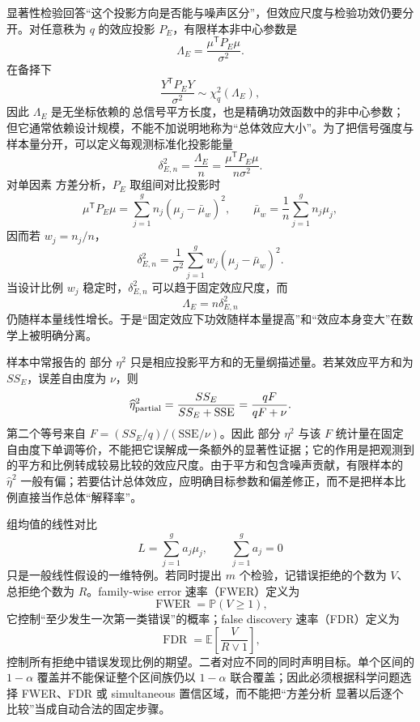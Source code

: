 \begin{definition}
显著性检验回答“这个投影方向是否能与噪声区分”，但效应尺度与检验功效仍要分开。对任意秩为 $q$ 的效应投影 $P_E$，有限样本非中心参数是
\begin{equation*}\Lambda_E
 =\frac{\mu^{\mathsf T}P_E\mu}{\sigma^2}.
\end{equation*}
在备择下
\[
 \frac{Y^{\mathsf T}P_EY}{\sigma^2}
 \sim\chi^2_q(\Lambda_E),
\]
因此 $\Lambda_E$ 是无坐标依赖的\,总信号平方长度，也是精确功效函数中的非中心参数；但它通常依赖设计规模，不能不加说明地称为“总体效应大小”。为了把信号强度与样本量分开，可以定义每观测标准化投影能量
\begin{equation*}\delta_{E,n}^2
 =\frac{\Lambda_E}{n}
 =\frac{\mu^{\mathsf T}P_E\mu}{n\sigma^2}.
\end{equation*}
对单因素 方差分析，$P_E$ 取组间对比投影时
\[
 \mu^{\mathsf T}P_E\mu
 =\sum_{j=1}^g n_j(\mu_j-\bar\mu_w)^2,
 \qquad
 \bar\mu_w=\frac1n\sum_{j=1}^gn_j\mu_j,
\]
因而若 $w_j=n_j/n$，
\[
 \delta_{E,n}^2
 =\frac1{\sigma^2}
 \sum_{j=1}^g w_j(\mu_j-\bar\mu_w)^2.
\]
当设计比例 $w_j$ 稳定时，$\delta_{E,n}^2$ 可以趋于固定效应尺度，而
\[
 \Lambda_E=n\delta_{E,n}^2
\]
仍随样本量线性增长。于是“固定效应下功效随样本量提高”和“效应本身变大”在数学上被明确分离。

样本中常报告的 部分 $\eta^2$ 只是相应投影平方和的无量纲描述量。若某效应平方和为 $SS_E$，误差自由度为 $\nu$，则
\begin{equation*}\widehat\eta^2_{\rm partial}
 =\frac{SS_E}{SS_E+\mathrm{SSE}}
 =\frac{qF}{qF+\nu}.
\end{equation*}
第二个等号来自 $F=(SS_E/q)/(\mathrm{SSE}/\nu)$。因此 部分 $\eta^2$ 与该 $F$ 统计量在固定自由度下单调等价，不能把它误解成一条额外的显著性证据；它的作用是把观测到的平方和比例转成较易比较的效应尺度。由于平方和包含噪声贡献，有限样本的 $\widehat\eta^2$ 一般有偏；若要估计总体效应，应明确目标参数和偏差修正，而不是把样本比例直接当作总体“解释率”。
\end{definition}

\begin{definition}[对比、族错误率与错误发现率]
组均值的线性对比
\[
 L=\sum_{j=1}^ga_j\mu_j,
 \qquad
 \sum_{j=1}^ga_j=0
\]
只是一般线性假设的一维特例。若同时提出 $m$ 个检验，记错误拒绝的个数为 $V$、总拒绝个数为 $R$。family-wise error 速率（FWER）定义为
\[
 \operatorname{FWER}=\mathbb P(V\ge1),
\]
它控制“至少发生一次第一类错误”的概率；false discovery 速率（FDR）定义为
\[
 \operatorname{FDR}
 =\mathbb E\!\left[\frac{V}{R\vee1}\right],
\]
控制所有拒绝中错误发现比例的期望。二者对应不同的同时声明目标。单个区间的 $1-\alpha$ 覆盖并不能保证整个区间族仍以 $1-\alpha$ 联合覆盖；因此必须根据科学问题选择 FWER、FDR 或 simultaneous 置信区域，而不能把“方差分析 显著以后逐个比较”当成自动合法的固定步骤。
\end{definition}

